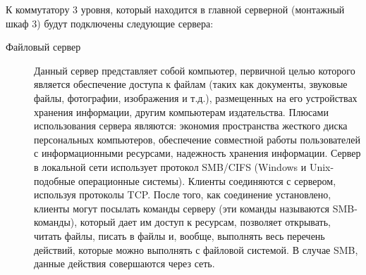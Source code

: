 К коммутатору 3 уровня, который находится в главной серверной (монтажный шкаф 3) будут подключены следующие сервера:
\begin{description}
\item[Файловый сервер]
  Данный сервер представляет собой компьютер, первичной целью которого является обеспечение доступа к файлам (таких как документы, звуковые файлы, фотографии, изображения и т.д.), размещенных на его устройствах хранения информации, другим компьютерам издательства. Плюсами использования сервера являются: экономия пространства жесткого диска персональных компьютеров, обеспечение совместной работы пользователей с информационными ресурсами, надежность хранения информации. Сервер в локальной сети использует протокол SMB/CIFS (Windows и Unix-подобные операционные системы). Клиенты соединяются с сервером, используя протоколы TCP. После того, как соединение установлено, клиенты могут посылать команды серверу (эти команды называются SMB-команды), который дает им доступ к ресурсам, позволяет открывать, читать файлы, писать в файлы и, вообще, выполнять весь перечень действий, которые можно выполнять с файловой системой. В случае SMB, данные действия совершаются через сеть.


\end{description}
